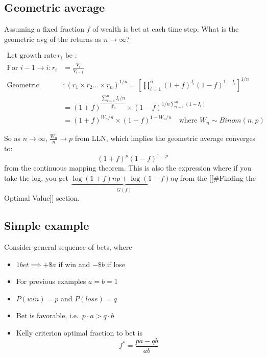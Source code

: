 \documentclass[
  oneside]{book}
\providecommand{\tightlist}{%
  \setlength{\itemsep}{0pt}\setlength{\parskip}{0pt}}
\begin{document}
\hypertarget{geometric-average}{%
\subsection{Geometric average}\label{geometric-average}}

Assuming a fixed fraction \(f\) of wealth is bet at each time step. What is the geometric avg of the returns as \(n\to \infty\)?

\[
\begin{aligned}
\text{Let growth rate } r_{i} &\text{ be }:\\
\text{For } i-1 \to i: r_{i} &= \frac{V_{i}}{V_{i-1}}\\
\text{Geometric Average: }&: (r_{1} \times r_{2}\dots \times r_{n})^{1/n} = \left[ \prod^{n}_{i=1}(1+f)^{I_{i}}(1-f)^{1-I_{i}} \right] ^{1/n}\\
&= (1+f)^{\underbrace{ \sum^{n}_{i=1}I_{i}/n }_{ W_{n} }} \times (1-f)^{1/n \sum^{n}_{i=1}(1-I_{i})}\\
&= (1+f)^{W_{n}/n}\times (1-f)^{1-W_{n}/n} \quad \text{where } W_{n}\sim Binom(n,p)
\end{aligned}
\]

So as \(n\to \infty\), \(\frac{W_{n}}{n}\to p\) from LLN, which implies the geometric average converges to:
\[
(1+f)^{p}(1-f)^{1-p}
\]
from the continuous mapping theorem. This is also the expression where if you take the log, you get \(\underbrace{ \log(1+f)np+\log(1-f)nq }_{ G(f) }\) from the {[}{[}\#Finding the Optimal Value{]}{]} section.

\hypertarget{simple-example}{%
\subsection{Simple example}\label{simple-example}}

Consider general sequence of bets, where

\begin{itemize}
\tightlist
\item
  \(1 bet \implies +\$a\) if win and \(−\$b\) if lose
\item
  For previous examples \(a = b = 1\)
\item
  \(P(win)=p\) and \(P(lose)=q\)
\item
  Bet is favorable, i.e.~\(p\cdot a> q\cdot b\)
\item
  Kelly criterion optimal fraction to bet is
  \[
  f^{*} = \frac{pa-qb}{ab}
  \]
\end{itemize}
\end{document}
